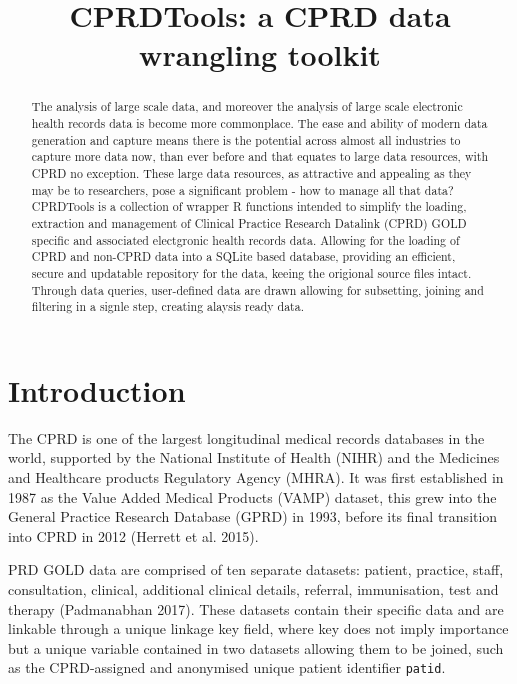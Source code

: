 \documentclass[
]{article}
\title{CPRDTools: a CPRD data wrangling toolkit}
\author{}
\date{\vspace{-2.5em}}
\begin{document}
\maketitle
\begin{abstract}
The analysis of large scale data, and moreover the analysis of large
scale electronic health records data is become more commonplace. The
ease and ability of modern data generation and capture means there is
the potential across almost all industries to capture more data now,
than ever before and that equates to large data resources, with CPRD no
exception. These large data resources, as attractive and appealing as
they may be to researchers, pose a significant problem - how to manage
all that data? CPRDTools is a collection of wrapper R functions intended
to simplify the loading, extraction and management of Clinical Practice
Research Datalink (CPRD) GOLD specific and associated electgronic health
records data. Allowing for the loading of CPRD and non-CPRD data into a
SQLite based database, providing an efficient, secure and updatable
repository for the data, keeing the origional source files intact.
Through data queries, user-defined data are drawn allowing for
subsetting, joining and filtering in a signle step, creating alaysis
ready data.
\end{abstract}

\hypertarget{introduction}{%
\section{Introduction}\label{introduction}}

The CPRD is one of the largest longitudinal medical records databases in
the world, supported by the National Institute of Health (NIHR) and the
Medicines and Healthcare products Regulatory Agency (MHRA). It was first
established in 1987 as the Value Added Medical Products (VAMP) dataset,
this grew into the General Practice Research Database (GPRD) in 1993,
before its final transition into CPRD in 2012 (Herrett et al. 2015).

PRD GOLD data are comprised of ten separate datasets: patient, practice,
staff, consultation, clinical, additional clinical details, referral,
immunisation, test and therapy (Padmanabhan 2017). These datasets
contain their specific data and are linkable through a unique linkage
key field, where key does not imply importance but a unique variable
contained in two datasets allowing them to be joined, such as the
CPRD-assigned and anonymised unique patient identifier \texttt{patid}.
\end{document}
